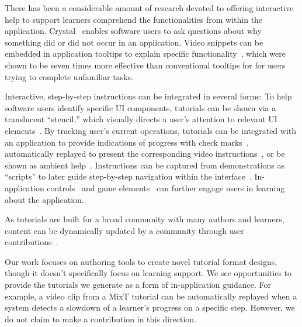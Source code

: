 There has been a considerable amount of research devoted to offering interactive help to support learners comprehend the functionalities from within the application.
%
Crystal~\cite{Myers:2006:AWW:1124772.1124832} enables software users to ask questions about why something did or did not occur in an application.
%
Video snippets can be embedded in application tooltips to explain specific functionality~\cite{Grossman:2010wr}, which were shown to be seven times more effective than conventional tooltips for for users trying to complete unfamiliar tasks.

Interactive, step-by-step instructions can be integrated in several forms:
%
To help software users identify specific UI components, tutorials can be shown via a translucent ``stencil,'' which visually directs a user's attention to relevant UI elements~\cite{Kelleher:2005:STD:1054972.1055047}.
%
By tracking user's current operations, tutorials can be integrated with an application to provide indications of progress with check marks~\cite{Fernquist:2011:SRE:2047196.2047245}, automatically replayed to present the corresponding video instructions~\cite{Pongnumkul:2011ju}, or be shown as ambient help~\cite{Matejka:2011:AH:1978942.1979349}.
%
Instructions can be captured from demonstrations as ``scripts'' to later guide step-by-step navigation within the interface~\cite{Bergman:2005:DocWizards}. In-application controls~\cite{Lieberman:2014:SML:2557500.2557543} and game elements~\cite{Li:2014:CGM:2556288.2556954, Dontcheva:2014:CCL:2556288.2557217} can further engage users in learning about the application.

As tutorials are built for a broad community with many authors and learners, content can be dynamically updated by a community through user contributions~\cite{Lafreniere:2013ff,Matejka:2009:CCR:1622176.1622214, Bunt:2014:TPI:2556288.2557118}.

Our work focuses on authoring tools to create novel tutorial format designs, though it doesn't specifically focus on learning support. We see opportunities to provide the tutorials we generate as a form of in-application guidance. For example, a video clip from a MixT tutorial can be automatically replayed when a system detects a slowdown of a learner's progress on a specific step. However, we do not claim to make a contribution in this direction.



